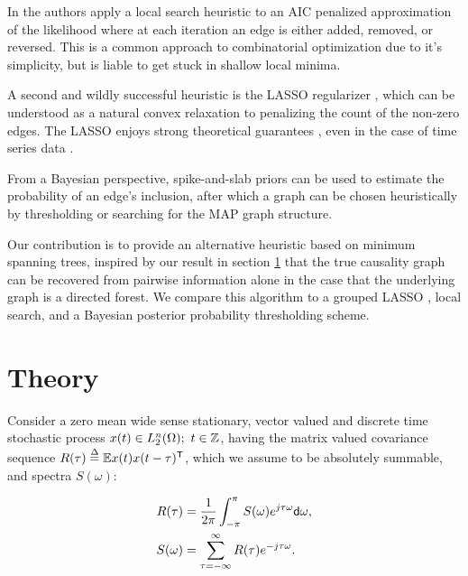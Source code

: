 \documentclass[12pt]{article}
\begin{document}
In \cite{bach2004learning} the authors apply a local search heuristic
to an AIC penalized approximation of the likelihood where at each
iteration an edge is either added, removed, or reversed.  This is a
common approach to combinatorial optimization due to it's simplicity,
but is liable to get stuck in shallow local minima.

A second and wildly successful heuristic is the LASSO regularizer
\cite{tibshirani1996regression}, which can be understood as a natural
convex relaxation to penalizing the count of the non-zero edges.  The
LASSO enjoys strong theoretical guarantees \cite{wainwright2009sharp},
even in the case of time series data \cite{basu2015}
\cite{wong2016lasso}.

From a Bayesian perspective, spike-and-slab priors can be used to
estimate the probability of an edge's inclusion, after which a graph
can be chosen heuristically by thresholding or searching for the MAP
graph structure.

Our contribution is to provide an alternative heuristic based on
minimum spanning trees, inspired by our result in section
\ref{sec:theory} that the true causality graph can be recovered from
pairwise information alone in the case that the underlying graph is a
directed forest.  We compare this algorithm to a grouped LASSO
\cite{yuan2006model}, local search, and a Bayesian posterior
probability thresholding scheme.


\section{Theory}
\label{sec:theory}
Consider a zero mean wide sense stationary, vector valued and discrete
time stochastic process $x(t) \in L^n_2(\Omega);\ t \in \mathbb{Z}$, having the matrix
valued covariance sequence
$R(\tau) \overset{\Delta}{=} \mathbb{E} x(t)x(t - \tau)^{\mathsf{T}}$, which we assume to be
absolutely summable, and spectra $S(\omega)$:

\begin{equation}
  \label{eqn:fourier_pair}
  \begin{aligned}
    R(\tau) &= \frac{1}{2\pi}\int_{-\pi}^\pi S(\omega) e^{j\tau\omega}\mathsf{d} \omega,\\
    S(\omega) &= \sum_{\tau=-\infty}^\infty R(\tau)e^{-j\tau\omega}.
  \end{aligned}
\end{equation}
\end{document}
